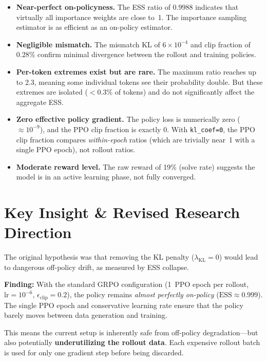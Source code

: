 \documentclass[11pt,a4paper]{article}
\begin{document}
\begin{itemize}[leftmargin=*]
  \item \textbf{Near-perfect on-policyness.} The ESS ratio of $0.9988$ indicates
    that virtually all importance weights are close to~1. The importance sampling
    estimator is as efficient as an on-policy estimator.

  \item \textbf{Negligible mismatch.} The mismatch KL of $6 \times 10^{-4}$ and
    clip fraction of $0.28\%$ confirm minimal divergence between the rollout and
    training policies.

  \item \textbf{Per-token extremes exist but are rare.} The maximum ratio reaches
    up to 2.3, meaning some individual tokens see their probability double. But
    these extremes are isolated ($<\!0.3\%$ of tokens) and do not significantly
    affect the aggregate ESS.

  \item \textbf{Zero effective policy gradient.} The policy loss is numerically
    zero ($\approx 10^{-9}$), and the PPO clip fraction is exactly 0. With
    \texttt{kl\_coef=0}, the PPO clip fraction compares \emph{within-epoch}
    ratios (which are trivially near~1 with a single PPO epoch), not rollout
    ratios.

  \item \textbf{Moderate reward level.} The raw reward of 19\% (solve rate)
    suggests the model is in an active learning phase, not fully converged.
\end{itemize}


\section{Key Insight \& Revised Research Direction}
\label{sec:insight}

\begin{keyinsight}
The original hypothesis was that removing the KL penalty ($\lambda_{\mathrm{KL}}
= 0$) would lead to dangerous off-policy drift, as measured by ESS collapse.

\textbf{Finding:} With the standard GRPO configuration (1~PPO epoch per rollout,
$\mathrm{lr} = 10^{-6}$, $\epsilon_{\mathrm{clip}} = 0.2$), the policy remains
\emph{almost perfectly on-policy} ($\mathrm{ESS} \approx 0.999$). The single
PPO epoch and conservative learning rate ensure that the policy barely moves
between data generation and training.

This means the current setup is inherently safe from off-policy degradation---but
also potentially \textbf{underutilizing the rollout data}. Each expensive rollout
batch is used for only one gradient step before being discarded.
\end{keyinsight}
\end{document}
